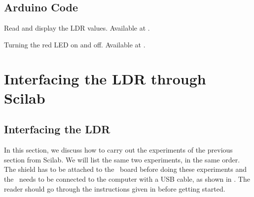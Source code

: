 \subsection{Arduino Code}
\label{sec:ldr-arduino-code}

\begin{ardcode}
{Read and display the LDR values.  Available at
  .}
\label{ard:ldr-read}

\end{ardcode}

\begin{ardcode}
{Turning the red LED on and off.  Available at
  .}
\label{ard:ldr-led}

\end{ardcode}

\section{Interfacing the LDR through Scilab}
\subsection{Interfacing the LDR}
In this section, we discuss how to carry out the experiments of the
previous section from Scilab. We will list the same two experiments,
in the same order.  The shield has to be attached to the \arduino\ board
before doing these experiments and the \arduino\ needs to be connected to the computer 
with a USB cable, as shown in .
The reader should go through the instructions given in
 before getting started. 


